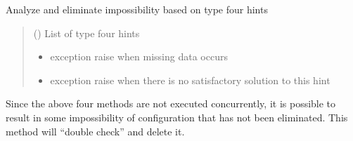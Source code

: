 \documentclass[letterpaper,10pt,english]{sphinxmanual}
\begin{document}
\begin{fulllineitems}
\begin{fulllineitems}
\end{fulllineitems}


\begin{fulllineitems}
\label{\detokenize{condition_analysis:condition_analysis.CondBoard.leftCond}}
\pysigstartsignatures
{}
\pysigstopsignatures
\sphinxAtStartPar
Analyze and eliminate impossibility based on type four hints
\begin{quote}\begin{description}
\sphinxAtStartPar
{} () \textendash{} List of type four hints

\begin{itemize}
\item {} 
\sphinxAtStartPar
{} \textendash{} exception \sphinxhyphen{} raise when missing data occurs

\item {} 
\sphinxAtStartPar
{} \textendash{} exception \sphinxhyphen{} raise when there is no             satisfactory solution to this hint

\end{itemize}

\end{description}\end{quote}

\end{fulllineitems}


\begin{fulllineitems}
\label{\detokenize{condition_analysis:condition_analysis.CondBoard.remRedundantCond}}
\pysigstartsignatures
{}
\pysigstopsignatures
\sphinxAtStartPar
Since the above four methods are not executed concurrently,
it is possible to result in some impossibility of configuration
that has not been eliminated. This method will “double check”
and delete it.


\end{fulllineitems}
\end{fulllineitems}
\end{document}
